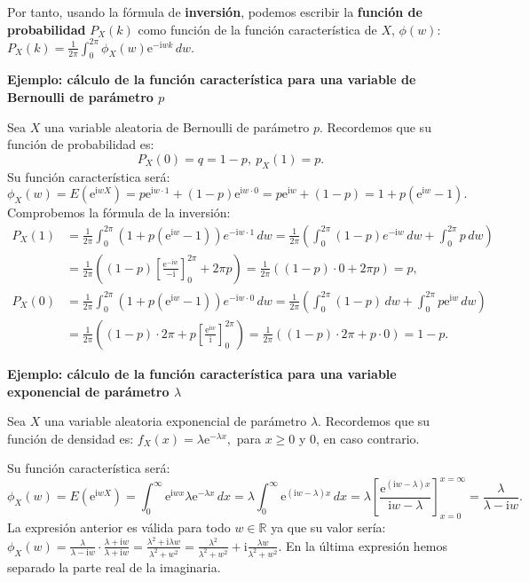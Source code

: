 \documentclass[
  letterpaper,
  DIV=11,
  numbers=noendperiod]{scrreprt}
\begin{document}
Por tanto, usando la fórmula de \textbf{inversión}, podemos escribir la
\textbf{función de probabilidad} \(P_X(k)\) como función de la función
característica de \(X\), \(\phi(w)\):
\(P_X(k)=\frac{1}{2\pi}\int_{0}^{2\pi} \phi_X(w)\mathrm{e}^{-\mathrm{i}w k}\, dw.\)

\textbf{Ejemplo: cálculo de la función característica para una variable
de Bernoulli de parámetro \(p\)}

Sea \(X\) una variable aleatoria de Bernoulli de parámetro \(p\).
Recordemos que su función de probabilidad es: \[
P_X(0)=q=1-p,\ p_X(1)=p.
\] Su función característica será: \[
\phi_X (w)=E\left(\mathrm{e}^{\mathrm{i}wX}\right) =p\mathrm{e}^{\mathrm{i}w\cdot 1}+(1-p)\mathrm{e}^{\mathrm{i}w\cdot 0}=p\mathrm{e}^{\mathrm{i}w}+(1-p)=1+p\left(\mathrm{e}^{\mathrm{i}w} -1 \right).
\] Comprobemos la fórmula de la inversión: \[
\begin{array}{rl}
P_X(1) & = \frac{1}{2\pi}\int_0^{2\pi} \left(1+p\left(\mathrm{e}^{\mathrm{i}w} -1 \right)\right) e^{-\mathrm{i}w\cdot 1}\, dw =\frac{1}{2\pi}\left(\int_0^{2\pi} (1-p)e^{-\mathrm{i}w}\, dw + \int_0^{2\pi} p\, dw\right) \\ & = \frac{1}{2\pi}\left( (1-p) \left[\frac{\mathrm{e}^{-\mathrm{i}w}}{-\mathrm{i}}\right]_0^{2\pi} +2\pi p\right)=\frac{1}{2\pi}\left((1-p)\cdot 0 +2\pi p\right)=p, \\
P_X(0) & = \frac{1}{2\pi}\int_0^{2\pi} \left(1+p\left(\mathrm{e}^{\mathrm{i}w} -1 \right)\right) e^{-\mathrm{i}w\cdot 0}\, dw =\frac{1}{2\pi}\left(\int_0^{2\pi} (1-p) \, dw + \int_0^{2\pi} p \mathrm{e}^{\mathrm{i}w}\, dw\right) \\ & = \frac{1}{2\pi}\left( (1-p) \cdot 2\pi  +p \left[\frac{\mathrm{e}^{\mathrm{i}w}}{\mathrm{i}}\right]_0^{2\pi}\right)=\frac{1}{2\pi}\left((1-p)\cdot 2\pi + p\cdot 0\right)=1-p.
\end{array}
\]

\textbf{Ejemplo: cálculo de la función característica para una variable
exponencial de parámetro \(\lambda\)}

Sea \(X\) una variable aleatoria exponencial de parámetro \(\lambda\).
Recordemos que su función de densidad es:
\(f_X(x)=\lambda \mathrm{e}^{-\lambda x},\) para \(x\geq 0\) y \(0\), en
caso contrario.

Su función característica será: \[
\phi_X (w)=E\left(\mathrm{e}^{\mathrm{i}wX}\right)=\int_0^\infty \mathrm{e}^{\mathrm{i}w x}\lambda \mathrm{e}^{-\lambda x}\, dx = \lambda \int_0^\infty\mathrm{e}^{(\mathrm{i}w-\lambda)x}\, dx = \lambda\left[\frac{\mathrm{e}^{(\mathrm{i}w-\lambda)x}}{\mathrm{i}w-\lambda}\right]_{x=0}^{x=\infty} = \frac{\lambda}{\lambda -\mathrm{i} w}. 
\] La expresión anterior es válida para todo \(w\in\mathbb{R}\) ya que
su valor sería:
\(\phi_X (w)=\frac{\lambda}{\lambda -\mathrm{i} w}\cdot \frac{\lambda +\mathrm{i} w}{\lambda +\mathrm{i} w}=\frac{\lambda^2+\mathrm{i}\lambda w}{\lambda^2+w^2}=\frac{\lambda^2}{\lambda^2+w^2}+\mathrm{i}\frac{\lambda w}{\lambda^2+w^2}.\)
En la última expresión hemos separado la parte real de la imaginaria.
\end{document}
